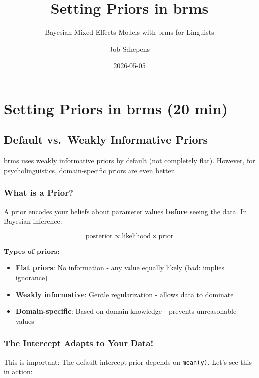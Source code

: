 \documentclass[
  11pt,
]{article}
\title{Setting Priors in brms}
\subtitle{Bayesian Mixed Effects Models with brms for Linguists}
\author{Job Schepens}
\date{2026-05-05}
\providecommand{\tightlist}{%
  \setlength{\itemsep}{0pt}\setlength{\parskip}{0pt}}
\renewcommand*\contentsname{Table of contents}
\newcommand\contentsname{Table of contents}
\begin{document}
\maketitle

\renewcommand*\contentsname{Table of contents}
{
\hypersetup{linkcolor=}
\setcounter{tocdepth}{3}
\tableofcontents
}

\section{Setting Priors in brms (20
min)}\label{setting-priors-in-brms-20-min}

\subsection{Default vs.~Weakly Informative
Priors}\label{default-vs.-weakly-informative-priors}

brms uses weakly informative priors by default (not completely flat).
However, for psycholinguistics, domain-specific priors are even better.

\subsubsection{What is a Prior?}\label{what-is-a-prior}

A prior encodes your beliefs about parameter values \textbf{before}
seeing the data. In Bayesian inference:

\[\text{posterior} \propto \text{likelihood} \times \text{prior}\]

\textbf{Types of priors:}

\begin{itemize}
\tightlist
\item
  \textbf{Flat priors}: No information - any value equally likely (bad:
  implies ignorance)
\item
  \textbf{Weakly informative}: Gentle regularization - allows data to
  dominate
\item
  \textbf{Domain-specific}: Based on domain knowledge - prevents
  unreasonable values
\end{itemize}

\subsubsection{The Intercept Adapts to Your
Data!}\label{the-intercept-adapts-to-your-data}

This is important: The default intercept prior depends on
\texttt{mean(y)}. Let's see this in action:
\end{document}
